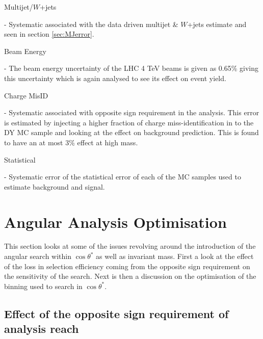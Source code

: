     {\bf\raggedright Multijet/$W$+jets} - Systematic associated with the data driven multijet \& $W$+jets estimate and seen in section \ref{sec:MJerror}. \\
    {\bf\raggedright Beam Energy} - The beam energy uncertainty of the LHC 4 TeV beams is given as 0.65\% giving this uncertainty which is again analysed to see its effect on event yield. \\
    {\bf\raggedright Charge MisID} - Systematic associated with opposite sign requirement in the analysis. This error is estimated by injecting a higher fraction of charge miss-identification in to the DY MC sample and looking at the effect on background prediction. This is found to have an at most 3\% effect at high mass. \\
    {\bf\raggedright Statistical} - Systematic error of the statistical error of each of the MC samples used to estimate background and signal. \\






\section{Angular Analysis Optimisation}


This section looks at some of the issues revolving around the introduction of the angular search within $\cos{\theta^{*}}$ as well as invariant mass. First a look at the effect of the loss in selection efficiency coming from the opposite sign requirement on the sensitivity of the search. Next is then a discussion on the optimisation of the binning used to search in $\cos{\theta^{*}}$.

\subsection{Effect of the opposite sign requirement of analysis reach}
    \label{sec:oppSign}

